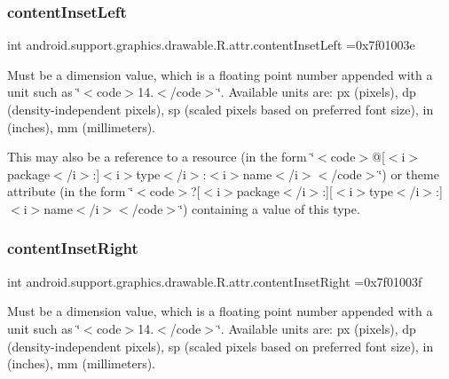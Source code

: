 \subsubsection{\texorpdfstring{content\+Inset\+Left}{contentInsetLeft}}
{\footnotesize\ttfamily int android.\+support.\+graphics.\+drawable.\+R.\+attr.\+content\+Inset\+Left =0x7f01003e\hspace{0.3cm}{\ttfamily [static]}}

Must be a dimension value, which is a floating point number appended with a unit such as \char`\"{}$<$code$>$14.\+5sp$<$/code$>$\char`\"{}. Available units are\+: px (pixels), dp (density-\/independent pixels), sp (scaled pixels based on preferred font size), in (inches), mm (millimeters). 

This may also be a reference to a resource (in the form \char`\"{}$<$code$>$@\mbox{[}$<$i$>$package$<$/i$>$\+:\mbox{]}$<$i$>$type$<$/i$>$\+:$<$i$>$name$<$/i$>$$<$/code$>$\char`\"{}) or theme attribute (in the form \char`\"{}$<$code$>$?\mbox{[}$<$i$>$package$<$/i$>$\+:\mbox{]}\mbox{[}$<$i$>$type$<$/i$>$\+:\mbox{]}$<$i$>$name$<$/i$>$$<$/code$>$\char`\"{}) containing a value of this type. \mbox{\label{classandroid_1_1support_1_1graphics_1_1drawable_1_1R_1_1attr_a9ebd76210a2797f0e62964d23cb3bf77}} 
\subsubsection{\texorpdfstring{content\+Inset\+Right}{contentInsetRight}}
{\footnotesize\ttfamily int android.\+support.\+graphics.\+drawable.\+R.\+attr.\+content\+Inset\+Right =0x7f01003f\hspace{0.3cm}{\ttfamily [static]}}

Must be a dimension value, which is a floating point number appended with a unit such as \char`\"{}$<$code$>$14.\+5sp$<$/code$>$\char`\"{}. Available units are\+: px (pixels), dp (density-\/independent pixels), sp (scaled pixels based on preferred font size), in (inches), mm (millimeters). 

